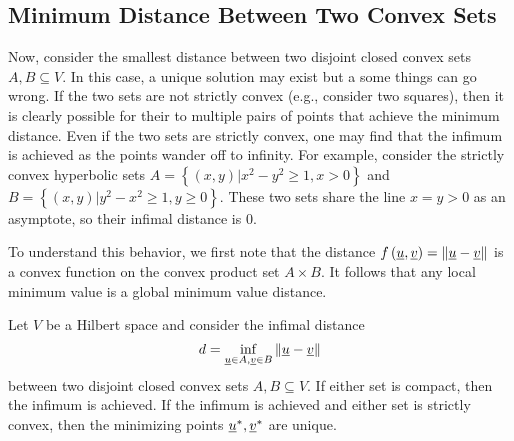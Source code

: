 \subsection{Minimum Distance Between Two Convex Sets}

Now, consider the smallest distance between two disjoint closed convex sets $A,B\subseteq V$. In this case, a unique solution may exist but a some things can go wrong. If the two sets are not strictly convex (e.g., consider two squares), then it is clearly possible for their to multiple pairs of points that achieve the minimum distance. Even if the two sets are strictly convex, one may find that the infimum is achieved as the points wander off to infinity. For example, consider the strictly convex hyperbolic sets $A=\left\{ (x,y)|x^{2}-y^{2}\geq1,x>0\right\} $ and $B=\left\{ (x,y)|y^{2}-x^{2}\geq1,y\geq0\right\} $. These two sets share the line $x=y>0$ as an asymptote, so their infimal distance is 0.

To understand this behavior, we first note that the distance $f\left(\underline u,\underline v\right)=\left\Vert \underline u-\underline v\right\Vert $ is a convex function on the convex product set $A\times B$.
It follows that any local minimum value is a global minimum value distance.
\begin{theorem}
\label{thm:MinDistTwoConvexSet} Let $V$ be a Hilbert space and consider the infimal distance
\[
d=\inf_{\underline u\in A,\underline v\in B}\left\Vert \underline u-\underline v\right\Vert 
\]
between two disjoint closed convex sets $A,B\subseteq V$.
If either set is compact, then the infimum is achieved.
If the infimum is achieved and either set is strictly convex, then the minimizing points $\underline u^{*},\underline v^{*}$ are unique.
\end{theorem}

